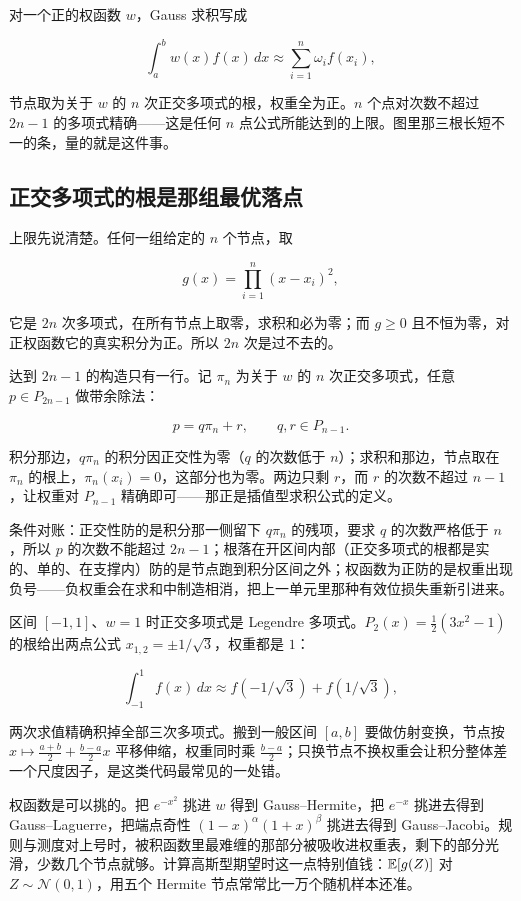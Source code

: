 对一个正的权函数 \(w\)，Gauss 求积写成

\[
\int_a^bw(x)f(x)\,dx\approx\sum_{i=1}^n\omega_if(x_i),
\]

节点取为关于 \(w\) 的 \(n\) 次正交多项式的根，权重全为正。\(n\) 个点对次数不超过 \(2n-1\) 的多项式精确——这是任何 \(n\) 点公式所能达到的上限。图里那三根长短不一的条，量的就是这件事。

\subsection{正交多项式的根是那组最优落点}

上限先说清楚。任何一组给定的 \(n\) 个节点，取

\[
g(x)=\prod_{i=1}^n(x-x_i)^2,
\]

它是 \(2n\) 次多项式，在所有节点上取零，求积和必为零；而 \(g\ge0\) 且不恒为零，对正权函数它的真实积分为正。所以 \(2n\) 次是过不去的。

达到 \(2n-1\) 的构造只有一行。记 \(\pi_n\) 为关于 \(w\) 的 \(n\) 次正交多项式，任意 \(p\in P_{2n-1}\) 做带余除法：

\[
p=q\pi_n+r,\qquad q,r\in P_{n-1}.
\]

积分那边，\(q\pi_n\) 的积分因正交性为零（\(q\) 的次数低于 \(n\)）；求积和那边，节点取在 \(\pi_n\) 的根上，\(\pi_n(x_i)=0\)，这部分也为零。两边只剩 \(r\)，而 \(r\) 的次数不超过 \(n-1\)，让权重对 \(P_{n-1}\) 精确即可——那正是插值型求积公式的定义。

条件对账：正交性防的是积分那一侧留下 \(q\pi_n\) 的残项，要求 \(q\) 的次数严格低于 \(n\)，所以 \(p\) 的次数不能超过 \(2n-1\)；根落在开区间内部（正交多项式的根都是实的、单的、在支撑内）防的是节点跑到积分区间之外；权函数为正防的是权重出现负号——负权重会在求和中制造相消，把上一单元里那种有效位损失重新引进来。

区间 \([-1,1]\)、\(w=1\) 时正交多项式是 Legendre 多项式。\(P_2(x)=\tfrac12(3x^2-1)\) 的根给出两点公式 \(x_{1,2}=\pm1/\sqrt3\)，权重都是 \(1\)：

\[
\int_{-1}^1f(x)\,dx\approx f(-1/\sqrt3)+f(1/\sqrt3),
\]

两次求值精确积掉全部三次多项式。搬到一般区间 \([a,b]\) 要做仿射变换，节点按 \(x\mapsto\frac{a+b}{2}+\frac{b-a}{2}x\) 平移伸缩，权重同时乘 \(\frac{b-a}{2}\)；只换节点不换权重会让积分整体差一个尺度因子，是这类代码最常见的一处错。

权函数是可以挑的。把 \(e^{-x^2}\) 挑进 \(w\) 得到 Gauss--Hermite，把 \(e^{-x}\) 挑进去得到 Gauss--Laguerre，把端点奇性 \((1-x)^\alpha(1+x)^\beta\) 挑进去得到 Gauss--Jacobi。规则与测度对上号时，被积函数里最难缠的那部分被吸收进权重表，剩下的部分光滑，少数几个节点就够。计算高斯型期望时这一点特别值钱：\(\mathbb{E}[g(Z)]\) 对 \(Z\sim\mathcal N(0,1)\)，用五个 Hermite 节点常常比一万个随机样本还准。

